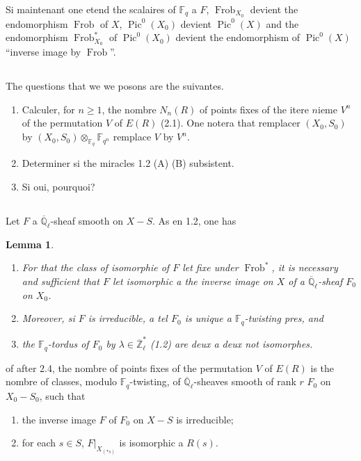 \documentclass[11pt,a4paper]{article}
\theoremstyle{plain}
\newtheorem{lemma}[theorem]{Lemma}
\theoremstyle{definition}
\DeclareMathOperator{\Pic}{Pic}
\DeclareMathOperator{\Frob}{Frob}
\newcommand{\F}{\mathbb{F}}
\newcommand{\Ql}{\overline{\mathbb{Q}}_\ell}
\newcommand{\Zl}{\overline{\mathbb{Z}}_\ell}
\begin{document}
Si maintenant one etend the scalaires of $\F_q$ a $F$, $\Frob_{X_0}$ devient the endomorphism $\Frob$ of $X$, $\Pic^0(X_0)$ devient $\Pic^0(X)$ and the endomorphism $\Frob_{X_0}^*$ of $\Pic^0(X_0)$ devient the endomorphism of $\Pic^0(X)$ ``inverse image by $\Frob$''.

\subsection{}
The questions that we we posons are the suivantes.

\begin{enumerate}[label=(\roman*)]
\item Calculer, for $n \geq 1$, the nombre $N_n(R)$ of points fixes of the itere $n$ieme $V^n$ of the permutation $V$ of $E(R)$ (2.1). One notera that remplacer $(X_0, S_0)$ by $(X_0, S_0) \otimes_{\F_q} \F_{q^n}$ remplace $V$ by $V^n$.
\item Determiner si the miracles 1.2 (A) (B) subsistent.
\item Si oui, pourquoi?
\end{enumerate}

\subsection{}
Let $F$ a $\Ql$-sheaf smooth on $X - S$. As en 1.2, one has

\begin{lemma}
\begin{enumerate}[label=(\roman*)]
\item For that the class of isomorphie of $F$ let fixe under $\Frob^*$, it is necessary and sufficient that $F$ let isomorphic a the inverse image on $X$ of a $\Ql$-sheaf $F_0$ on $X_0$.
\item Moreover, si $F$ is irreducible, a tel $F_0$ is unique a $\F_q$-twisting pres, and
\item the $\F_q$-tordus of $F_0$ by $\lambda \in \Zl^*$ (1.2) are deux a deux not isomorphes.
\end{enumerate}
\end{lemma}

of after 2.4, the nombre of points fixes of the permutation $V$ of $E(R)$ is the nombre of classes, modulo $\F_q$-twisting, of $\Ql$-sheaves smooth of rank $r$ $F_0$ on $X_0 - S_0$, such that
\begin{enumerate}[label=(\alph*)]
\item the inverse image $F$ of $F_0$ on $X - S$ is irreducible;
\item for each $s \in S$, $F|_{X_{(*s)}}$ is isomorphic a $R(s)$.
\end{enumerate}
\end{document}
